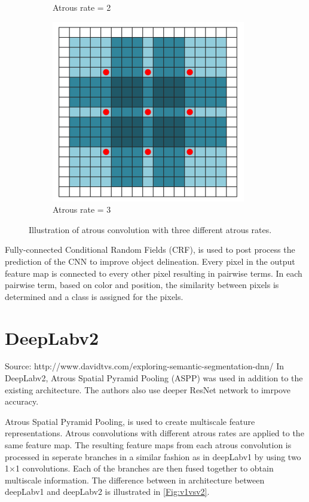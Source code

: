 \begin{figure}[!htb]
\begin{subfigure}{.3\textwidth}
			\caption{Atrous rate = 2}
		\end{subfigure}
		\begin{subfigure}{.3\textwidth}
			\centering
			\includegraphics[width=1\linewidth]{images/r_3}
			\caption{Atrous rate = 3}
		\end{subfigure}
		\caption{Illustration of atrous convolution with three different atrous rates.}
		\label{Fig:atconv}
	\end{figure}
	
Fully-connected Conditional Random Fields (CRF), is used to post process the prediction of the CNN to improve object delineation. Every pixel in the output feature map is connected to every other pixel resulting in pairwise terms. In each pairwise term, based on color and position, the similarity between pixels is determined and a class is assigned for the pixels.


\section{DeepLabv2}

Source: http://www.davidtvs.com/exploring-semantic-segmentation-dnn/
In DeepLabv2, Atrous Spatial Pyramid Pooling (ASPP) was used in addition to the existing architecture. The authors also use deeper ResNet network to imrpove accuracy.

Atrous Spatial Pyramid Pooling, is used to create multiscale feature representations. Atrous convolutions with different atrous rates are applied to the same feature map. The resulting feature maps from each atrous convolution is processed in seperate branches in a similar fashion as in deepLabv1 by using two 1$\times$1 convolutions. Each of the branches are then fused together to obtain multiscale information. The difference between in architecture between deepLabv1 and deepLabv2 is illustrated in \ref{Fig:v1vsv2}.

